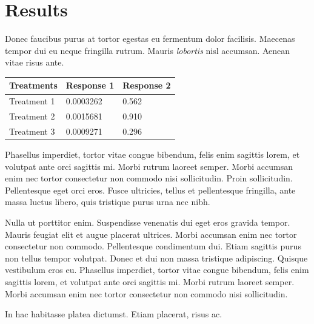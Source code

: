 \documentclass[a0,portrait, 30pt]{a0poster}
\begin{document}
\begin{minipage}{0.49\linewidth}
  \large
\section*{Results}

Donec faucibus purus at tortor egestas eu fermentum dolor facilisis. Maecenas tempor dui eu neque fringilla rutrum. Mauris \emph{lobortis} nisl accumsan. Aenean vitae risus ante.
%
\begin{table} %
\begin{tabular}{l l l}
\toprule
\textbf{Treatments} & \textbf{Response 1} & \textbf{Response 2}\\
\midrule
Treatment 1 & 0.0003262 & 0.562 \\
Treatment 2 & 0.0015681 & 0.910 \\
Treatment 3 & 0.0009271 & 0.296 \\
\bottomrule
\end{tabular}
\end{table}
%
Phasellus imperdiet, tortor vitae congue bibendum, felis enim sagittis lorem, et volutpat ante orci sagittis mi. Morbi rutrum laoreet semper. Morbi accumsan enim nec tortor consectetur non commodo nisi sollicitudin. Proin sollicitudin. Pellentesque eget orci eros. Fusce ultricies, tellus et pellentesque fringilla, ante massa luctus libero, quis tristique purus urna nec nibh.

Nulla ut porttitor enim. Suspendisse venenatis dui eget eros gravida tempor. Mauris feugiat elit et augue placerat ultrices. Morbi accumsan enim nec tortor consectetur non commodo. Pellentesque condimentum dui. Etiam sagittis purus non tellus tempor volutpat. Donec et dui non massa tristique adipiscing. Quisque vestibulum eros eu. Phasellus imperdiet, tortor vitae congue bibendum, felis enim sagittis lorem, et volutpat ante orci sagittis mi. Morbi rutrum laoreet semper. Morbi accumsan enim nec tortor consectetur non commodo nisi sollicitudin.

\begin{center}\vspace{1cm}
\end{center}\vspace{1cm}

In hac habitasse platea dictumst. Etiam placerat, risus ac.


\end{minipage}
\end{document}
